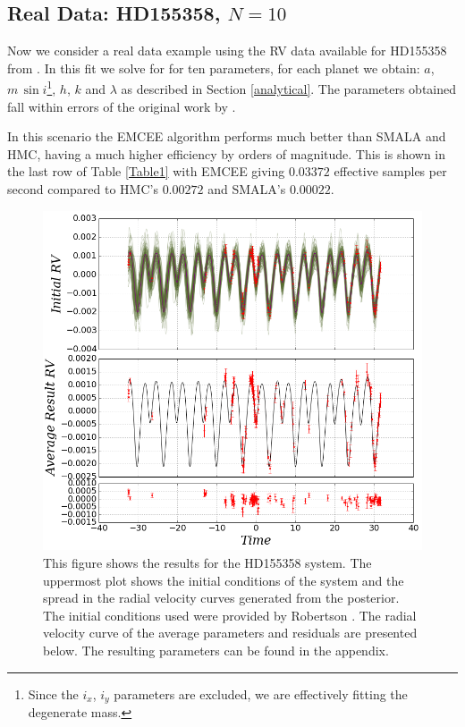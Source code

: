 \documentclass{aa}
\begin{document}
\subsection{Real Data: HD155358, $N=10$}

Now we consider a real data example using the RV data available for HD155358 from \cite{Robertson2012}. In this fit we solve for for ten parameters, for each planet we obtain: $a$, $m\, \sin i$\footnote{Since the $i_x$, $i_y$ parameters are excluded, we are effectively fitting the degenerate mass.}, $h$, $k$ and $\lambda$ as described in Section \ref{analytical}. The parameters obtained fall within errors of the original work by \cite{Robertson2012}.

In this scenario the EMCEE algorithm performs much better than SMALA and HMC, having a much higher efficiency by orders of magnitude. This is shown in the last row of Table \ref{Table1} with EMCEE giving $0.03372$ effective samples per second compared to HMC's $0.00272$ and SMALA's $0.00022$.

\begin{figure}
\centering
\includegraphics[width=0.95\hsize]{rv3-1.png}
   \caption{This figure shows the results for the HD155358 system. The uppermost plot shows the initial conditions of the system and the spread in the radial velocity curves generated from the posterior. The initial conditions used were provided by Robertson \cite{Robertson2012}. The radial velocity curve of the average parameters and residuals are presented below. The resulting parameters can be found in the appendix.}
      \label{FigHD}
\end{figure}
\end{document}
